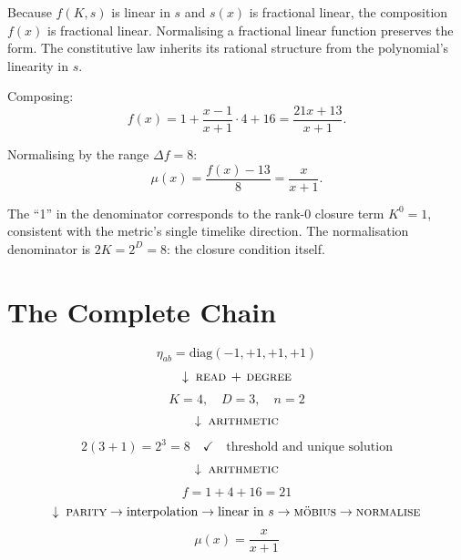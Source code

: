 \documentclass[twocolumn]{iopjournal}
\begin{document}
Because $f(K,s)$ is linear in $s$ and $s(x)$ is fractional
linear, the composition $f(x)$ is fractional linear.
Normalising a fractional linear function preserves the form.
The constitutive law inherits its rational structure from the
polynomial's linearity in $s$.

Composing:
\begin{equation}
  f(x) = 1 + \frac{x - 1}{x + 1} \cdot 4 + 16
       = \frac{21x + 13}{x + 1}.
\end{equation}

Normalising by the range $\Delta f = 8$:
\begin{equation}
  \mu(x) = \frac{f(x) - 13}{8} = \frac{x}{x + 1}.
  \label{eq:mu}
\end{equation}

The ``1'' in the denominator corresponds to the rank-0 closure
term $K^0 = 1$, consistent with the metric's single timelike
direction. The normalisation denominator is
$2K = 2^D = 8$: the closure condition itself.


\section*{The Complete Chain}

\begin{equation*}
  \boxed{\eta_{ab} = \mathrm{diag}(-1,+1,+1,+1)}
\end{equation*}
\vspace{-6pt}
\begin{equation*}
  \downarrow\; \textsc{read + degree}
\end{equation*}
\vspace{-6pt}
\begin{equation*}
  \boxed{K = 4, \quad D = 3, \quad n = 2}
\end{equation*}
\vspace{-6pt}
\begin{equation*}
  \downarrow\; \textsc{arithmetic}
\end{equation*}
\vspace{-6pt}
\begin{equation*}
  \boxed{2(3+1) = 2^3 = 8 \quad \checkmark \quad
  \text{threshold and unique solution}}
\end{equation*}
\vspace{-6pt}
\begin{equation*}
  \downarrow\; \textsc{arithmetic}
\end{equation*}
\vspace{-6pt}
\begin{equation*}
  \boxed{f = 1 + 4 + 16 = 21}
\end{equation*}
\vspace{-6pt}
\begin{equation*}
  \downarrow\; \textsc{parity} \to \text{interpolation} \to
  \text{linear in } s \to \textsc{m\"{o}bius} \to
  \textsc{normalise}
\end{equation*}
\vspace{-6pt}
\begin{equation*}
  \boxed{\mu(x) = \frac{x}{x+1}}
\end{equation*}
\end{document}
